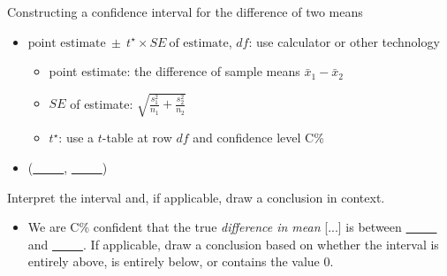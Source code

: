 \begin{onebox}{Constructing a confidence interval for the difference of two means}
\begin{itemize}
\item[] $\text{point estimate}\ \pm \ t^{\star} \times SE\ \text{of estimate}$, \quad $df$: use calculator or other technology
\begin{itemize}
\item[] point estimate: the difference of sample means $\bar{x}_1 - \bar{x}_2$
\item[] $SE$ of estimate:  $\sqrt{\frac{s^2_1}{n_1}+\frac{s^2_2}{n_2}}$
\item[] $t^{\star}$: use a $t$-table at row $df$ and confidence level C\%
\end{itemize}
\item[] (\underline{\ \ \ \ \ }, \underline{\ \ \ \ \ })
\end{itemize}
  Interpret the interval and, if applicable, draw a conclusion in context.\vspace{-1mm}
\begin{itemize}
\item[] We are C\%  confident that the true \emph{difference in mean} [...] is between \underline{\ \ \ \ \ } and  \underline{\ \ \ \ \ }. If applicable, draw a conclusion based on whether the interval is entirely above, is entirely below, or contains the value 0. 
\end{itemize}\end{onebox}

